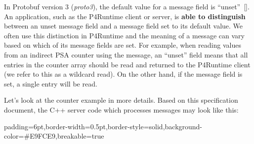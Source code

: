 \documentclass[11pt]{article}
\begin{document}
{%
\noindent{}In Protobuf version 3 (\emph{proto3}), the default value for a message field is
\textquotedblleft{}unset\textquotedblright{}~[]. An application, such as the P4Runtime client or
server, is \textbf{able to distinguish} between an unset message field and a message
field set to its default value. We often use this distinction in P4Runtime
and the meaning of a message can vary based on which of its message fields are
set. For example, when reading values from an indirect PSA counter using the
 message, an \textquotedblleft{}unset\textquotedblright{}  field means that all entries in the
counter array should be read and returned to the P4Runtime client (we refer to
this as a wildcard read). On the other hand, if the  message field is
set, a single entry will be read.%

Let's look at the counter example in more details. Based on this specification
document, the C++ server code which processes  messages may look
like this:%

\begin{mdbmargintb}{6pt}{6pt}%
\begin{mdblock}{padding=6pt,border-width=0.5pt,border-style=solid,background-color=\#E9FCE9,breakable=true}%
\begin{mdpre}%
\end{mdpre}%
\end{mdblock}%
\end{mdbmargintb}%

}
\end{document}
